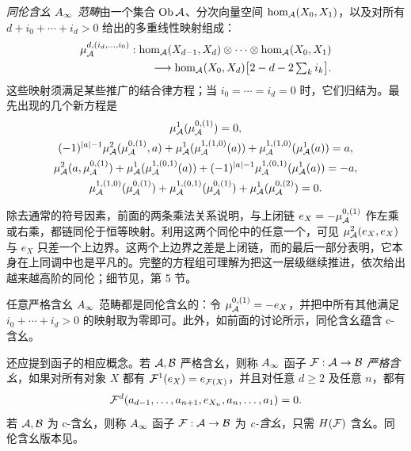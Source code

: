 \begin{definition*}
\emph{同伦含幺 $A_\infty$ 范畴}由一个集合 $\operatorname{Ob}\mathcal A$、分次向量空间 $\hom_{\mathcal A}(X_0,X_1)$，以及对所有 $d+i_0+\cdots+i_d>0$ 给出的多重线性映射组成：
\begin{equation}\label{eq:2.2}
\begin{aligned}
\mu^{d,(i_d,\ldots,i_0)}_{\mathcal A}:\hom_{\mathcal A}(X_{d-1},X_d)\otimes\cdots\otimes\hom_{\mathcal A}(X_0,X_1)\\
\longrightarrow\hom_{\mathcal A}(X_0,X_d)\bigl[2-d-2\textstyle\sum_k i_k\bigr].
\end{aligned}
\end{equation}
这些映射须满足某些推广的结合律方程；当 $i_0=\cdots=i_d=0$ 时，它们归结为。最先出现的几个新方程是
\begin{equation}\label{eq:2.3}
\begin{gathered}
\mu^1_{\mathcal A}(\mu^{0,(1)}_{\mathcal A})=0,\\
(-1)^{|a|-1}\mu^2_{\mathcal A}(\mu^{0,(1)}_{\mathcal A},a)
+\mu^1_{\mathcal A}(\mu^{1,(1,0)}_{\mathcal A}(a))
+\mu^{1,(1,0)}_{\mathcal A}(\mu^1_{\mathcal A}(a))=a,\\
\mu^2_{\mathcal A}(a,\mu^{0,(1)}_{\mathcal A})
+\mu^1_{\mathcal A}(\mu^{1,(0,1)}_{\mathcal A}(a))
+(-1)^{|a|-1}\mu^{1,(0,1)}_{\mathcal A}(\mu^1_{\mathcal A}(a))=-a,\\
\mu^{1,(1,0)}_{\mathcal A}(\mu^{0,(1)}_{\mathcal A})
+\mu^{1,(0,1)}_{\mathcal A}(\mu^{0,(1)}_{\mathcal A})
+\mu^1_{\mathcal A}(\mu^{0,(2)}_{\mathcal A})=0.
\end{gathered}
\end{equation}

\end{definition*}
除去通常的符号因素，前面的两条乘法关系说明，与上闭链 $e_X=-\mu^{0,(1)}_{\mathcal A}$ 作左乘或右乘，都链同伦于恒等映射。利用这两个同伦中的任意一个，可见 $\mu^2_{\mathcal A}(e_X,e_X)$ 与 $e_X$ 只差一个上边界。这两个上边界之差是上闭链，而的最后一部分表明，它本身在上同调中也是平凡的。完整的方程组可理解为把这一层级继续推进，依次给出越来越高阶的同伦；细节见，第 5 节。

任意严格含幺 $A_\infty$ 范畴都是同伦含幺的：令 $\mu^{0,(1)}_{\mathcal A}=-e_X$，并把中所有其他满足 $i_0+\cdots+i_d>0$ 的映射取为零即可。此外，如前面的讨论所示，同伦含幺蕴含 c-含幺。

\begin{definition*}
还应提到函子的相应概念。若 $\mathcal A,\mathcal B$ 严格含幺，则称 $A_\infty$ 函子 $\mathcal F:\mathcal A\to\mathcal B$ \emph{严格含幺}，如果对所有对象 $X$ 都有 $\mathcal F^1(e_X)=e_{\mathcal F(X)}$，并且对任意 $d\ge2$ 及任意 $n$，都有
\[
\mathcal F^d(a_{d-1},\ldots,a_{n+1},e_{X_n},a_n,\ldots,a_1)=0.
\]
若 $\mathcal A,\mathcal B$ 为 c-含幺，则称 $A_\infty$ 函子 $\mathcal F:\mathcal A\to\mathcal B$ 为 \emph{c-含幺}，只需 $H(\mathcal F)$ 含幺。同伦含幺版本见。
\end{definition*}

